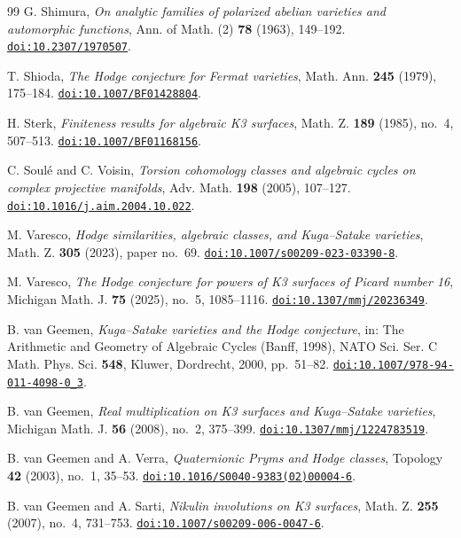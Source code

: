 \documentclass[11pt,reqno]{amsart}
\numberwithin{equation}{section}
\theoremstyle{plain}
\theoremstyle{definition}
\begin{document}
\begin{thebibliography}{99}
G. Shimura,
\emph{On analytic families of polarized abelian varieties and automorphic functions},
Ann. of Math. (2) \textbf{78} (1963), 149--192.
\href{https://doi.org/10.2307/1970507}{\nolinkurl{doi:10.2307/1970507}}.

T. Shioda,
\emph{The Hodge conjecture for Fermat varieties},
Math. Ann. \textbf{245} (1979), 175--184.
\href{https://doi.org/10.1007/BF01428804}{\nolinkurl{doi:10.1007/BF01428804}}.

H. Sterk,
\emph{Finiteness results for algebraic K3 surfaces},
Math. Z. \textbf{189} (1985), no.~4, 507--513.
\href{https://doi.org/10.1007/BF01168156}{\nolinkurl{doi:10.1007/BF01168156}}.

C. Soul\'e and C. Voisin,
\emph{Torsion cohomology classes and algebraic cycles on complex projective manifolds},
Adv. Math. \textbf{198} (2005), 107--127.
\href{https://doi.org/10.1016/j.aim.2004.10.022}{\nolinkurl{doi:10.1016/j.aim.2004.10.022}}.

M. Varesco,
\emph{Hodge similarities, algebraic classes, and Kuga--Satake varieties},
Math. Z. \textbf{305} (2023), paper no.~69.
\href{https://doi.org/10.1007/s00209-023-03390-8}{\nolinkurl{doi:10.1007/s00209-023-03390-8}}.

M. Varesco,
\emph{The Hodge conjecture for powers of K3 surfaces of Picard number 16},
Michigan Math. J. \textbf{75} (2025), no.~5, 1085--1116.
\href{https://doi.org/10.1307/mmj/20236349}{\nolinkurl{doi:10.1307/mmj/20236349}}.

B. van Geemen,
\emph{Kuga--Satake varieties and the Hodge conjecture},
in: The Arithmetic and Geometry of Algebraic Cycles (Banff, 1998),
NATO Sci. Ser. C Math. Phys. Sci. \textbf{548},
Kluwer, Dordrecht, 2000, pp.~51--82.
\href{https://doi.org/10.1007/978-94-011-4098-0_3}{\nolinkurl{doi:10.1007/978-94-011-4098-0_3}}.

B. van Geemen,
\emph{Real multiplication on K3 surfaces and Kuga--Satake varieties},
Michigan Math. J. \textbf{56} (2008), no.~2, 375--399.
\href{https://doi.org/10.1307/mmj/1224783519}{\nolinkurl{doi:10.1307/mmj/1224783519}}.

B. van Geemen and A. Verra,
\emph{Quaternionic Pryms and Hodge classes},
Topology \textbf{42} (2003), no.~1, 35--53.
\href{https://doi.org/10.1016/S0040-9383(02)00004-6}{\nolinkurl{doi:10.1016/S0040-9383(02)00004-6}}.

B. van Geemen and A. Sarti,
\emph{Nikulin involutions on K3 surfaces},
Math. Z. \textbf{255} (2007), no.~4, 731--753.
\href{https://doi.org/10.1007/s00209-006-0047-6}{\nolinkurl{doi:10.1007/s00209-006-0047-6}}.


\end{thebibliography}
\end{document}

